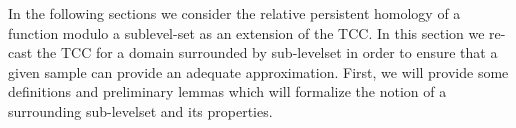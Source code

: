 
%
%

In the following sections we consider the relative persistent homology of a function modulo a sublevel-set as an extension of the TCC.
In this section we re-cast the TCC for a domain surrounded by sub-levelset in order to ensure that a given sample can provide an adequate approximation.
First, we will provide some definitions and preliminary lemmas which will formalize the notion of a surrounding sub-levelset and its properties.
